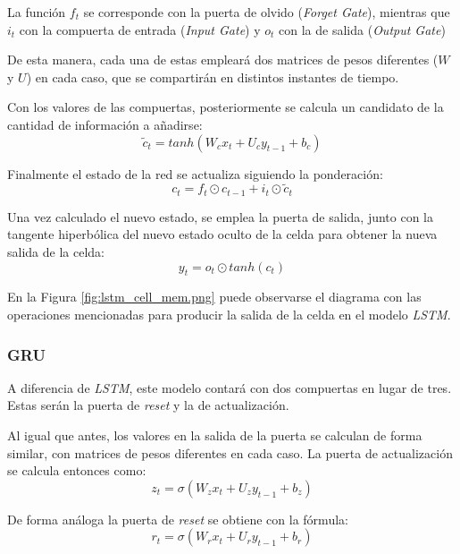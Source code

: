 La función \(f_t\) se corresponde con la puerta de olvido (\textit{Forget Gate}), mientras que 
\(i_t\) con la compuerta de entrada (\textit{Input Gate}) y \(o_t\) con la de salida (\textit{Output
Gate})

De esta manera, cada una de estas empleará dos matrices de pesos diferentes (\(W\) y \(U\)) en cada caso, que se compartirán
en distintos instantes de tiempo.

Con los valores de las compuertas, posteriormente se calcula un candidato de la cantidad de información
a añadirse:
\begin{equation}
    \widetilde{c}_t = tanh (W_{c} x_t + U_{c} y_{t-1} + b_c) 
\end{equation}

Finalmente el estado de la red se actualiza siguiendo la ponderación:
\begin{equation}
    c_t = f_t \odot  c_{t-1} + i_{t} \odot \widetilde{c}_t 
\end{equation}

Una vez calculado el nuevo estado, se emplea la puerta de salida, junto con la tangente hiperbólica
del nuevo estado oculto de la celda para obtener la nueva salida de la celda:
\begin{equation}
    y_t =  o_t \odot tanh(c_t)
\end{equation}

En la Figura \ref{fig:lstm_cell_mem.png} puede observarse el diagrama con las operaciones mencionadas
para producir la salida de la celda en el modelo \textit{LSTM}.

\subsubsection{GRU}
A diferencia de \textit{LSTM}, este modelo contará con dos compuertas en lugar 
de tres. Estas serán la puerta de \textit{reset} y la de actualización.

Al igual que antes, los valores en la salida de la puerta se calculan de forma similar,
con matrices de pesos diferentes en cada caso.
La puerta de actualización se calcula entonces como:
\begin{equation}
    z_t = \sigma(W_z x_t + U_z y_{t-1} + b_z)
\end{equation}

De forma análoga la puerta de \textit{reset} se obtiene con la fórmula:
\begin{equation}
    r_t = \sigma(W_r x_t + U_r y_{t-1} + b_r)
\end{equation}

